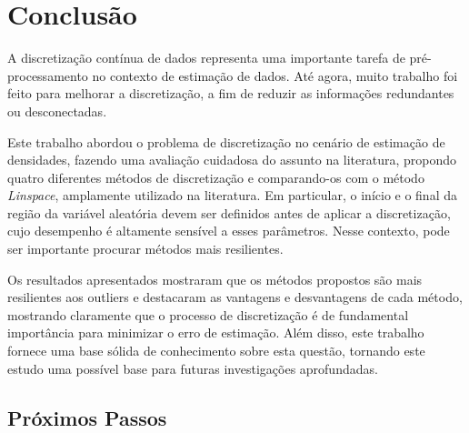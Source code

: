 \chapter{Conclusão} \label{cap:conclusao}
A discretização contínua de dados representa uma importante tarefa de pré-processamento no contexto de estimação de dados. Até agora, muito trabalho foi feito para melhorar a discretização, a fim de reduzir as informações redundantes ou desconectadas.

Este trabalho abordou o problema de discretização no cenário de estimação de densidades, fazendo uma avaliação cuidadosa do assunto na literatura, propondo quatro diferentes métodos de discretização e comparando-os com o método \textit{Linspace}, amplamente utilizado na literatura. Em particular, o início e o final da região da variável aleatória devem ser definidos antes de aplicar a discretização, cujo desempenho é altamente sensível a esses parâmetros. Nesse contexto, pode ser importante procurar métodos mais resilientes.

Os resultados apresentados mostraram que os métodos propostos são mais resilientes aos outliers e destacaram as vantagens e desvantagens de cada método, mostrando claramente que o processo de discretização é de fundamental importância para minimizar o erro de estimação. Além disso, este trabalho fornece uma base sólida de conhecimento sobre esta questão, tornando este estudo uma possível base para futuras investigações aprofundadas.
\section{Próximos Passos}
